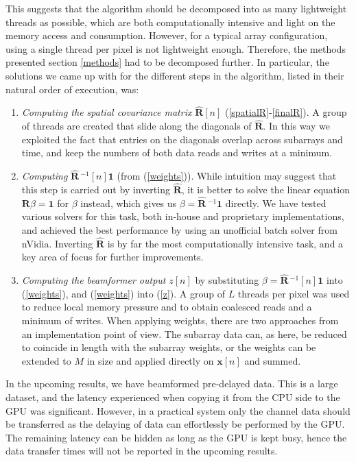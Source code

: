\documentclass[12pt,journal,captionsoff,onecolumn]{IEEEtran}
\renewcommand\vec[1]{\boldsymbol{#1}}
\newcommand\mat[1]{\boldsymbol{#1}}
\newcommand\1{\vec 1}
\newcommand*\x{\vec x}
\newcommand*\R{\mat R}
\newcommand*\eR{\mat{\hat R}}
\newcommand*\eRi{\hat{\mat R}\,\!^{-1}}
\begin{document}
This suggests that the algorithm should be decomposed into as many lightweight threads as possible, which are both computationally intensive and light on the memory access and consumption. However, for a typical array configuration, using a single thread per pixel is not lightweight enough. Therefore, the methods presented section \ref{methods} had to be decomposed further. In particular, the solutions we came up with for the different steps in the algorithm, listed in their natural order of execution, was:
\begin{enumerate}
\item \emph{Computing the spatial covariance matrix} $\eR[n]$ (\ref{spatialR}-\ref{finalR}). A group of threads are created that slide along the diagonals of $\eR$. In this way we exploited the fact that entries on the diagonals overlap across subarrays and time, and keep the numbers of both data reads and writes at a minimum.
\item \emph{Computing} $\eRi[n]\1$ (from (\ref{weights})). While intuition may suggest that this step is carried out by inverting $\eR$, it is better to solve the linear equation $\R\beta = \1$ for $\beta$ instead, which gives us $\beta = \eRi\1$ directly. We have tested various solvers for this task, both in-house and proprietary implementations, and achieved the best performance by using an unofficial batch solver from nVidia. Inverting $\eR$ is by far the most computationally intensive task, and a key area of focus for further improvements.
\item \emph{Computing the beamformer output} $z[n]$ by substituting $\beta = \eRi[n]\1$ into (\ref{weights}), and (\ref{weights}) into (\ref{z}). A group of $L$ threads per pixel was used to reduce local memory pressure and to obtain coalesced reads and a minimum of writes. When applying weights, there are two approaches from an implementation point of view. The subarray data can, as here, be reduced to coincide in length with the subarray weights, or the weights can be extended to $M$ in size and applied directly on $\x[n]$ and summed.  
\end{enumerate}

In the upcoming results, we have beamformed pre-delayed data. This is a large dataset, and the latency experienced when copying it from the \gls{CPU} side to the \gls{GPU} was significant. However, in a practical system only the channel data should be transferred as the delaying of data can effortlessly be performed by the \gls{GPU}. The remaining latency can be hidden as long as the \gls{GPU} is kept busy, hence the data transfer times will not be reported in the upcoming results.
\end{document}
